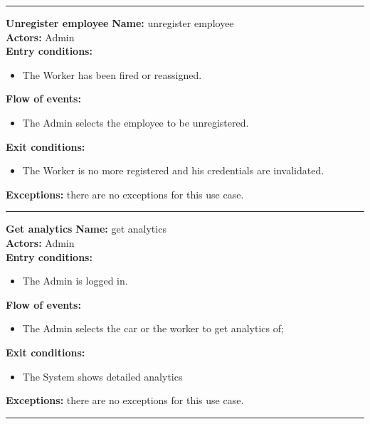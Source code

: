 \begin{center}
\noindent\rule{8cm}{1.0pt}
\end{center}


\textbf{\large Unregister employee}
\bigbreak
\textbf{Name:} unregister employee \\
\textbf{Actors:} Admin \\
\textbf{Entry conditions:} 
\begin{itemize}
\item The Worker has been fired or reassigned.
\end{itemize}
\textbf{Flow of events:} 
\begin{itemize}
\item The Admin selects the employee to be unregistered.
\end{itemize}
\textbf{Exit conditions:} 
\begin{itemize}
\item The Worker is no more registered and his credentials are invalidated.
\end{itemize}
\textbf{Exceptions:} there are no exceptions for this use case.\\


\begin{center}
\noindent\rule{8cm}{1.0pt}
\end{center}


\textbf{\large Get analytics}
\bigbreak
\textbf{Name:} get analytics \\
\textbf{Actors:} Admin \\
\textbf{Entry conditions:} 
\begin{itemize}
\item The Admin is logged in.
\end{itemize}
\textbf{Flow of events:} 
\begin{itemize}
\item The Admin selects the car or the worker to get analytics of;
\end{itemize}
\textbf{Exit conditions:} 
\begin{itemize}
\item The System shows detailed analytics
\end{itemize}
\textbf{Exceptions:} there are no exceptions for this use case.\\


\begin{center}
\noindent\rule{8cm}{1.0pt}
\end{center}


